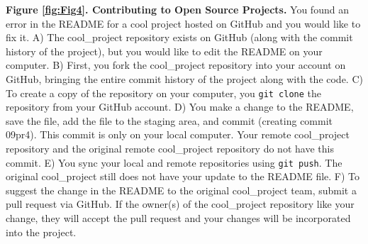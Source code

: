 \textbf{Figure \ref{fig:Fig4}. Contributing to Open Source Projects.}
You found an error in the README for a cool project hosted on GitHub and you would like to fix it.
A) The cool\_project repository exists on GitHub (along with the commit history of the project), but you would like to edit the README on your computer.
B) First, you fork the cool\_project repository into your account on GitHub, bringing the entire commit history of the project along with the code.
C) To create a copy of the repository on your computer, you \verb|git clone| the repository from your GitHub account.
D) You make a change to the README, save the file, add the file to the staging area, and commit (creating commit 09pr4).
This commit is only on your local computer.
Your remote cool\_project repository and the original remote cool\_project repository do not have this commit.
E) You sync your local and remote repositories using \verb|git push|.
The original cool\_project still does not have your update to the README file.
F) To suggest the change in the README to the original cool\_project team, submit a pull request via GitHub.
If the owner(s) of the cool\_project repository like your change, they will accept the pull request and your changes will be incorporated into the project.

  